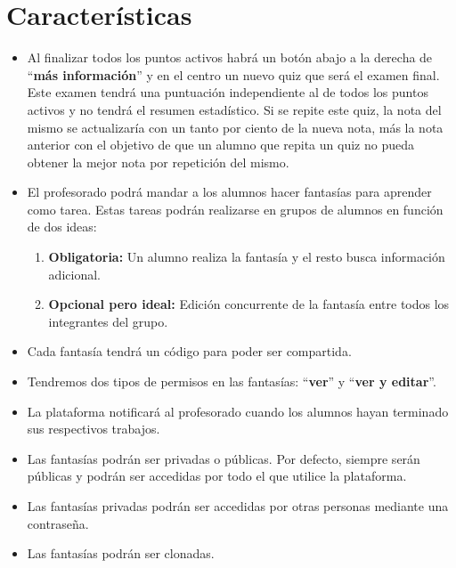 \documentclass[12pt,letterpaper]{article}
\begin{document}
\section{Características}
\begin{itemize}
	\item Al finalizar todos los puntos activos habrá un botón abajo a la derecha de ``\textbf{más información}'' y en el centro un nuevo quiz que será el examen final. Este examen tendrá una puntuación independiente al de todos los puntos activos y no tendrá el resumen estadístico. Si se repite este quiz, la nota del mismo se actualizaría con un tanto por ciento de la nueva nota, más la nota anterior con el objetivo de que un alumno que repita un quiz no pueda obtener la mejor nota por repetición del mismo.
	\item El profesorado podrá mandar a los alumnos hacer fantasías para aprender como tarea. Estas tareas podrán realizarse en grupos de alumnos en función de dos ideas:
	\begin{enumerate}
		\item \textbf{Obligatoria:} Un alumno realiza la fantasía y el resto busca información adicional.
		\item \textbf{Opcional pero ideal:} Edición concurrente de la fantasía entre todos los integrantes del grupo.
	\end{enumerate}
	\item Cada fantasía tendrá un código para poder ser compartida.
	\item Tendremos dos tipos de permisos en las fantasías: ``\textbf{ver}'' y ``\textbf{ver y editar}''.
	\item La plataforma notificará al profesorado cuando los alumnos hayan terminado sus respectivos trabajos.
	\item Las fantasías podrán ser privadas o públicas. Por defecto, siempre serán públicas y podrán ser accedidas por todo el que utilice la plataforma.
	\item Las fantasías privadas podrán ser accedidas por otras personas mediante una contraseña.
	\item Las fantasías podrán ser clonadas.
\end{itemize}
\end{document}
